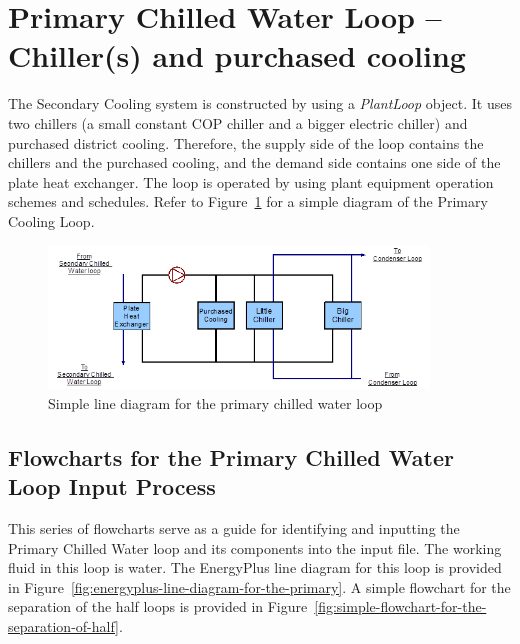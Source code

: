 \section{Primary Chilled Water Loop -- Chiller(s) and purchased cooling}\label{primary-chilled-water-loop-chillers-and-purchased-cooling}

The Secondary Cooling system is constructed by using a \emph{PlantLoop} object. It uses two chillers (a small constant COP chiller and a bigger electric chiller) and purchased district cooling. Therefore, the supply side of the loop contains the chillers and the purchased cooling, and the demand side contains one side of the plate heat exchanger. The loop is operated by using plant equipment operation schemes and schedules. Refer to Figure~\ref{fig:simple-line-diagram-for-the-primary-chilled} for a simple diagram of the Primary Cooling Loop.

\begin{figure}[hbtp] %
\centering
\includegraphics[width=0.9\textwidth, height=0.9\textheight, keepaspectratio=true]{media/image090.png}
\caption{Simple line diagram for the primary chilled water loop \protect \label{fig:simple-line-diagram-for-the-primary-chilled}}
\end{figure}

\subsection{Flowcharts for the Primary Chilled Water Loop Input Process}\label{flowcharts-for-the-primary-chilled-water-loop-input-process}

This series of flowcharts serve as a guide for identifying and inputting the Primary Chilled Water loop and its components into the input file. The working fluid in this loop is water. The EnergyPlus line diagram for this loop is provided in Figure~\ref{fig:energyplus-line-diagram-for-the-primary}. A simple flowchart for the separation of the half loops is provided in Figure~\ref{fig:simple-flowchart-for-the-separation-of-half}.

